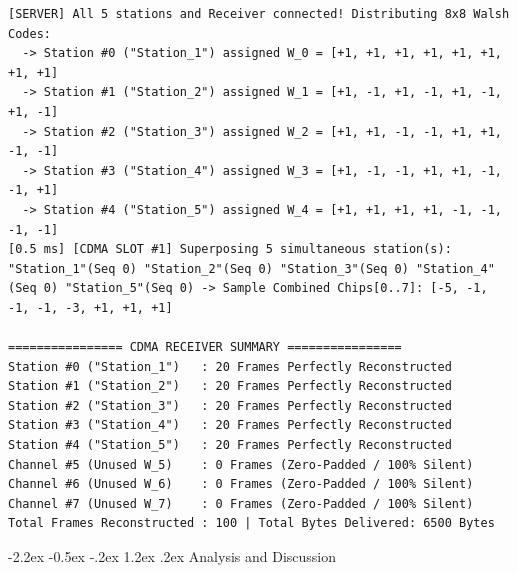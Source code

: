 \documentclass[11pt,a4paper]{article}
\makeatletter
\renewcommand\section{\@startsection {section}{1}{\z@}%
                                   {-2.2ex \@plus -0.5ex \@minus -.2ex}%
                                   {1.2ex \@plus.2ex}%
                                   {\normalfont\Large\bfseries}}
\makeatother
\begin{document}
\begin{lstlisting}[style=tracestyle, caption={Live execution trace of Test Case 5: $N=8$ spreading factor scaling.}, label={lst:trace_tc5}]
[SERVER] All 5 stations and Receiver connected! Distributing 8x8 Walsh Codes:
  -> Station #0 ("Station_1") assigned W_0 = [+1, +1, +1, +1, +1, +1, +1, +1]
  -> Station #1 ("Station_2") assigned W_1 = [+1, -1, +1, -1, +1, -1, +1, -1]
  -> Station #2 ("Station_3") assigned W_2 = [+1, +1, -1, -1, +1, +1, -1, -1]
  -> Station #3 ("Station_4") assigned W_3 = [+1, -1, -1, +1, +1, -1, -1, +1]
  -> Station #4 ("Station_5") assigned W_4 = [+1, +1, +1, +1, -1, -1, -1, -1]
[0.5 ms] [CDMA SLOT #1] Superposing 5 simultaneous station(s): "Station_1"(Seq 0) "Station_2"(Seq 0) "Station_3"(Seq 0) "Station_4"(Seq 0) "Station_5"(Seq 0) -> Sample Combined Chips[0..7]: [-5, -1, -1, -1, -3, +1, +1, +1]

================ CDMA RECEIVER SUMMARY ================
Station #0 ("Station_1")   : 20 Frames Perfectly Reconstructed
Station #1 ("Station_2")   : 20 Frames Perfectly Reconstructed
Station #2 ("Station_3")   : 20 Frames Perfectly Reconstructed
Station #3 ("Station_4")   : 20 Frames Perfectly Reconstructed
Station #4 ("Station_5")   : 20 Frames Perfectly Reconstructed
Channel #5 (Unused W_5)    : 0 Frames (Zero-Padded / 100% Silent)
Channel #6 (Unused W_6)    : 0 Frames (Zero-Padded / 100% Silent)
Channel #7 (Unused W_7)    : 0 Frames (Zero-Padded / 100% Silent)
Total Frames Reconstructed : 100 | Total Bytes Delivered: 6500 Bytes
\end{lstlisting}

\section{Analysis and Discussion}
\end{document}
